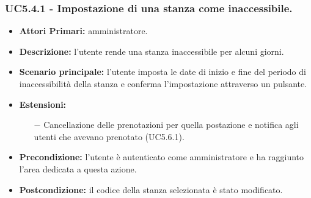 \subsubsection{ UC5.4.1 - Impostazione di una stanza come inaccessibile.}
\begin{itemize}
	\item\textbf{Attori Primari:}
	amministratore.
	\item\textbf{Descrizione:}
	l'utente rende una stanza inaccessibile per alcuni giorni.
	\item\textbf{Scenario principale:} 
	l'utente imposta le date di inizio e fine del periodo di inaccessibilità della stanza e conferma l'impostazione attraverso un pulsante.
	\item\textbf{Estensioni:}
	\begin{itemize}
		\item[$-$] Cancellazione delle prenotazioni per quella postazione e notifica agli utenti che avevano prenotato (UC5.6.1).
	\end{itemize}
	\item\textbf{Precondizione:} 
	l'utente è autenticato come amministratore e ha raggiunto l'area dedicata a questa azione.
	\item\textbf{Postcondizione:}
	il codice della stanza selezionata è stato modificato.
\end{itemize}

